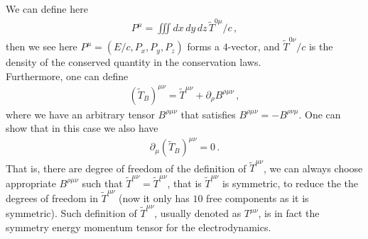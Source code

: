 \documentclass[11pt, onesided]{book}
\theoremstyle{break}
\theoremstyle{break}
\newcommand{\pd}{\partial}
\newcommand{\that}[1]{\widetilde{#1}}
\begin{document}
We can define here
\begin{align*}
P^\mu = \iiint dx\,dy\,dz \, \that{T}^{0\mu}/c\,,
\end{align*}
then we see here $P^\mu = (E/c,P_x,P_y,P_z)$ forms a $4$-vector, and $\that{T}^{0\nu}/c$ is the density of the conserved quantity in the conservation laws.\\

Furthermore, one can define
\begin{align*}
(\that{T}_B)^{\mu\nu} = \that{T}^{\mu\nu} + \pd_\rho B^{\rho \mu\nu}\,,
\end{align*}
where we have an arbitrary tensor $B^{\rho \mu\nu}$ that satisfies $B^{\rho \mu \nu} = -B^{\rho \nu \mu}$. One can show that in this case we also have
\begin{align*}
\pd_\mu (\that{T}_B)^{\mu\nu} = 0\,.
\end{align*}
That is, there are degree of freedom of the definition of $\that{T}^{\mu\nu}$, we can always choose appropriate $B^{\rho\mu\nu}$ such that $\that{T}^{\mu\nu} = \that{T}^{\mu\nu}$, that is $\that{T}^{\mu\nu}$ is symmetric, to reduce the the degrees of freedom in $\that{T}^{\mu\nu}$ (now it only has $10$ free components as it is symmetric). Such definition of $\that{T}^{\mu\nu}$, usually denoted as $T^{\mu\nu}$, is in fact the symmetry energy momentum tensor for the electrodynamics. \\
\end{document}
